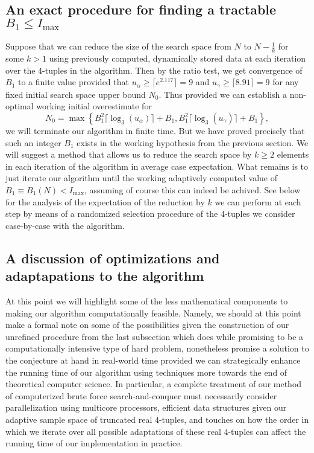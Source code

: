 \documentclass[12pt]{article}
\begin{document}
\subsection{An exact procedure for finding a tractable $B_1 \leq I_{\max}$} 
\label{SubSection_ArgConvOfB1} 

Suppose that we can reduce the size of the search space from $N$ to $N-\frac{1}{k}$ for some $k > 1$ 
using previously computed, dynamically stored data at each iteration over the $4$-tuples in the 
algorithm. Then by the ratio test, we get convergence of $B_1$ to a finite value provided that 
$u_{\alpha} \geq \lceil e^{2.117} \rceil = 9$ and $u_{\gamma} \geq \lceil 8.91 \rceil = 9$ 
for any fixed initial search space upper bound $N_0$. Thus provided we can establish a non-optimal 
working initial overestimate for 
$$N_0 = \max\left\{B_1^2 \lceil \log_3(u_{\alpha})\rceil+B_1, 
     B_1^2 \lceil \log_3(u_{\gamma})\rceil+B_1\right\},$$ 
we will terminate 
our algorithm in finite time. But we have proved precisely that such an integer $B_1$ exists in the 
working hypothesis from the previous section. We will suggest a method that allows us to reduce the 
search space by $k \geq 2$ elements in each iteration of the algorithm in average case expectation. 
What remains is to just iterate our algorithm until the working adaptively computed value of 
$B_1 \equiv B_1(N) < I_{\max}$, assuming of course this can indeed be achived. 
See below for the analysis of the 
expectation of the reduction by $k$ we can perform at each step by means of a randomized selection 
procedure of the $4$-tuples we consider case-by-case with the algorithm. 

\subsection{A discussion of optimizations and adaptapations to the algorithm} 

At this point we will highlight some of the less mathematical components to making our algorithm 
computationally feasible. Namely, we should at this point make a formal note on some of the 
possibilities given the construction of our unrefined procedure from the last subsection which does 
while promising to be a computationally intensive type of hard problem, nonetheless promise a solution 
to the conjecture at hand in real-world time provided we can strategically enhance the running time of 
our algorithm using techniques more towards the end of theoretical computer science. 
In particular, a complete treatment of our method of computerized brute force search-and-conquer 
must necessarily consider parallelization using multicore processors, efficient data structures given 
our adaptive sample space of truncated real $4$-tuples, and touches on how the order in which we 
iterate over all possible adaptations of these real $4$-tuples can affect the running time of our 
implementation in practice. 
\end{document}

